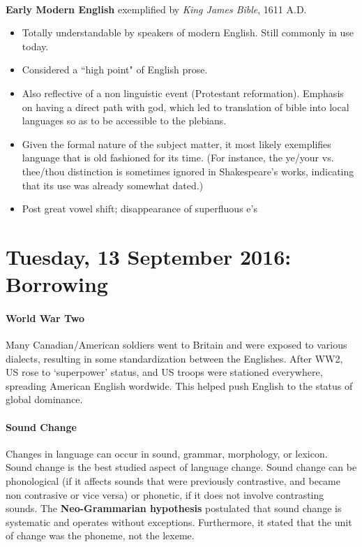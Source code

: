 \documentclass{exam}
\begin{document}
\noindent \textbf{\\Early Modern English} exemplified by \textit{King James Bible}, 1611 A.D. 
\begin{itemize}
\item Totally understandable by speakers of modern English. Still commonly in use today. 
\item Considered a ``high point" of English prose. 
\item Also reflective of a non linguistic event (Protestant reformation). 
    Emphasis on having a direct path with god, which led to translation of bible into local languages so as to be accessible to the plebians. 
    
    
\item Given the formal nature of the subject matter, it 
 most likely exemplifies language that is old fashioned for its time. 
 (For instance, the ye/your vs. thee/thou distinction is sometimes ignored in Shakespeare's works, indicating that its use was already somewhat dated.)
\item Post great vowel shift; disappearance of superfluous e's
\end{itemize}

 
\section* {Tuesday, 13 September 2016: Borrowing}


\paragraph{World War Two} Many Canadian/American soldiers went to Britain and were exposed to various dialects, resulting in some standardization between the Englishes. 
After WW2, US rose to `superpower' status, and US troops were stationed everywhere, spreading American English wordwide. 
This helped push English to the status of global dominance. 

\paragraph{Sound Change} Changes in language can occur in sound, grammar, morphology, or lexicon. 
Sound change is the best studied aspect of language change. 
Sound change can be phonological (if it affects sounds that were previously contrastive, and became non contrasive or vice versa) or phonetic, if it does not involve contrasting sounds. 
The \textbf{Neo-Grammarian hypothesis} postulated that sound change is systematic and operates without exceptions. 
Furthermore, it stated that the unit of change was the phoneme, not the lexeme. 
\end{document}
